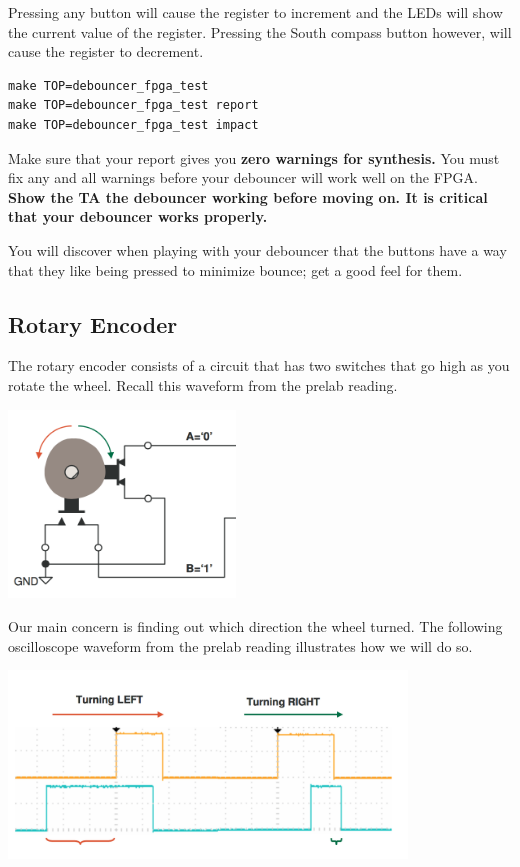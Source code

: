 \documentclass[11pt]{article}
\begin{document}
Pressing any button will cause the register to increment and the LEDs will show the current value of the register. Pressing the South compass button however, will cause the register to decrement.

\begin{verbatim}
make TOP=debouncer_fpga_test
make TOP=debouncer_fpga_test report
make TOP=debouncer_fpga_test impact
\end{verbatim} 

Make sure that your report gives you \textbf{zero warnings for synthesis.} You must fix any and all warnings before your debouncer will work well on the FPGA.\\

\textbf{Show the TA the debouncer working before moving on. It is critical that your debouncer works properly.}

You will discover when playing with your debouncer that the buttons have a way that they like being pressed to minimize bounce; get a good feel for them.

\subsection{Rotary Encoder}

The rotary encoder consists of a circuit that has two switches that go high as you rotate the wheel. Recall this waveform from the prelab reading.

\begin{center}
\includegraphics[height=5cm]{images/lab2_fig5.png}
\end{center}

Our main concern is finding out which direction the wheel turned. The following oscilloscope waveform from the prelab reading illustrates how we will do so. 

\begin{center}
	\includegraphics[height=5cm]{images/lab2_fig6.png}
\end{center}
\end{document}
